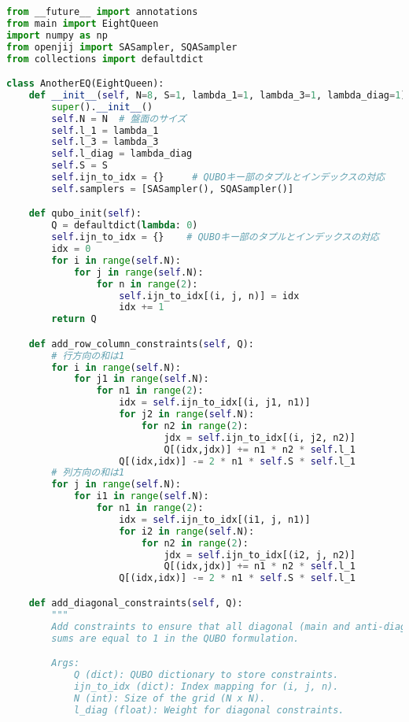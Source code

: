 \documentclass[uplatex,dvipdfmx,a4paper,11pt,oneside,openany]{jsbook}
\begin{document}
\begin{lstlisting}[language=Python]
from __future__ import annotations
from main import EightQueen
import numpy as np
from openjij import SASampler, SQASampler
from collections import defaultdict

class AnotherEQ(EightQueen):
    def __init__(self, N=8, S=1, lambda_1=1, lambda_3=1, lambda_diag=1):
        super().__init__()
        self.N = N  # 盤面のサイズ
        self.l_1 = lambda_1
        self.l_3 = lambda_3
        self.l_diag = lambda_diag
        self.S = S
        self.ijn_to_idx = {}     # QUBOキー部のタプルとインデックスの対応
        self.samplers = [SASampler(), SQASampler()]

    def qubo_init(self):
        Q = defaultdict(lambda: 0)
        self.ijn_to_idx = {}    # QUBOキー部のタプルとインデックスの対応
        idx = 0
        for i in range(self.N):
            for j in range(self.N):
                for n in range(2):
                    self.ijn_to_idx[(i, j, n)] = idx
                    idx += 1
        return Q

    def add_row_column_constraints(self, Q):
        # 行方向の和は1
        for i in range(self.N):
            for j1 in range(self.N):
                for n1 in range(2):
                    idx = self.ijn_to_idx[(i, j1, n1)]
                    for j2 in range(self.N):
                        for n2 in range(2):
                            jdx = self.ijn_to_idx[(i, j2, n2)]
                            Q[(idx,jdx)] += n1 * n2 * self.l_1
                    Q[(idx,idx)] -= 2 * n1 * self.S * self.l_1
        # 列方向の和は1
        for j in range(self.N):
            for i1 in range(self.N):
                for n1 in range(2):
                    idx = self.ijn_to_idx[(i1, j, n1)]
                    for i2 in range(self.N):
                        for n2 in range(2):
                            jdx = self.ijn_to_idx[(i2, j, n2)]
                            Q[(idx,jdx)] += n1 * n2 * self.l_1
                    Q[(idx,idx)] -= 2 * n1 * self.S * self.l_1

    def add_diagonal_constraints(self, Q):
        """
        Add constraints to ensure that all diagonal (main and anti-diagonal, including offset diagonals)
        sums are equal to 1 in the QUBO formulation.

        Args:
            Q (dict): QUBO dictionary to store constraints.
            ijn_to_idx (dict): Index mapping for (i, j, n).
            N (int): Size of the grid (N x N).
            l_diag (float): Weight for diagonal constraints.


\end{lstlisting}
\end{document}
